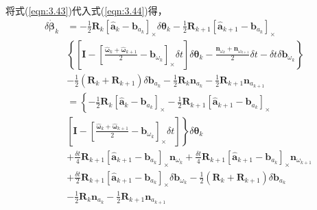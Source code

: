 将式(\ref{eqn:3.43})代入式(\ref{eqn:3.44})得，
\begin{equation}
\label{eqn:3.45}
\begin{aligned}
\delta \dot{\bm{\beta}}_{k} 
&= -\frac{1}{2} \mathbf{R}_{k}\left[\hat{\mathbf{a}}_{k} - \mathbf{b}_{a_{k}}\right]_\times \delta \bm{\theta}_{k}-\frac{1}{2} \mathbf{R}_{k+1}\left[\hat{\mathbf{a}}_{k+1}-\mathbf{b}_{a_{k}}\right]_\times \\
& \left\{\left[\mathbf{I}- \left[\frac{\hat{\bm{\omega}}_{k}+\hat{\bm{\omega}}_{k+1}}{2}-\mathbf{b}_{\omega_{k}}\right]_\times \delta t\right] \delta \bm{\theta}_{k} 
- \frac{\mathbf{n}_{\omega_{k}}+\mathbf{n}_{\omega_{k+1}}}{2} \delta t-\delta t \delta \mathbf{b}_{\omega_{k}}\right\} \\
& -\frac{1}{2}\left(\mathbf{R}_{k}+\mathbf{R}_{k+1}\right) \delta \mathbf{b}_{a_{k}}-\frac{1}{2} \mathbf{R}_{k} \mathbf{n}_{a_{k}}-\frac{1}{2} \mathbf{R}_{k+1} \mathbf{n}_{a_{k+1}} \\
&= \left\{-\frac{1}{2} \mathbf{R}_{k}\left[\hat{\mathbf{a}}_{k}-\mathbf{b}_{a_{k}}\right]_\times-\frac{1}{2} \mathbf{R}_{k+1}\left[\hat{\mathbf{a}}_{k+1}-\mathbf{b}_{a_{k}}\right]_\times\right. \\
& \left.\left[\mathbf{I}-\left[\frac{\hat{\bm{\omega}}_{k}+\hat{\bm{\omega}}_{k+1}}{2}-\mathbf{b}_{\omega_{k}}\right]_\times \delta t\right]\right\} \delta \bm{\theta}_{k} \\
& +\frac{\delta t}{4} \mathbf{R}_{k+1}\left[\hat{\mathbf{a}}_{k+1}-\mathbf{b}_{a_{k}}\right]_\times \mathbf{n}_{\omega_{k}}+\frac{\delta t}{4} \mathbf{R}_{k+1}\left[\hat{\mathbf{a}}_{k+1}-\mathbf{b}_{a_{k}}\right]_\times \mathbf{n}_{\omega_{k+1}} \\
&+ \frac{\delta t}{2} \mathbf{R}_{k+1}\left[\hat{\mathbf{a}}_{k+1}-\mathbf{b}_{a_{k}}\right]_\times \delta \mathbf{b}_{\omega_{k}} -\frac{1}{2}\left(\mathbf{R}_{k}+\mathbf{R}_{k+1}\right) \delta \mathbf{b}_{a_{k}} \\ 
&-\frac{1}{2} \mathbf{R}_{k} \mathbf{n}_{a_{k}}-\frac{1}{2} \mathbf{R}_{k+1} \mathbf{n}_{a_{k+1}}
\end{aligned}
\end{equation}

